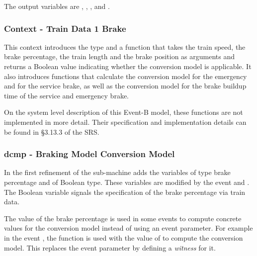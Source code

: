 \documentclass{template/openetcs_article}
\begin{document}
The output variables are , ,
,  and
.

{\footnotesize

}

\subsubsection{Context - Train Data 1 Brake}
\label{sec:context-train-data}

This context introduces the type  and a function
that takes the train speed, the brake percentage, the train length and the brake
position as arguments and returns a Boolean value indicating whether the
conversion model is applicable. It also introduces functions that calculate the
conversion model for the emergency and for the service brake, as well as the
conversion model for the brake buildup time of the service and emergency brake.

On the system level description of this Event-B model, these functions are not
implemented in more detail. Their specification and implementation details can
be found in §3.13.3 of the SRS.


{\footnotesize

}

\subsubsection{dcmp - Braking Model Conversion Model}
\label{sec:dcmp-braking-model-1}

In the first refinement of the sub-machine adds the variables
 of type brake percentage and
 of Boolean type. These variables are
modified by the event  and
. The Boolean variable signals the
specification of the brake percentage via train data.

The value of the brake percentage is used in some events to compute concrete
values for the conversion model instead of using an event parameter. For example
in the event , the function
 is used with the value
of to compute the conversion model. This replaces the
event parameter  by defining a \emph{witness} for it.
\end{document}
